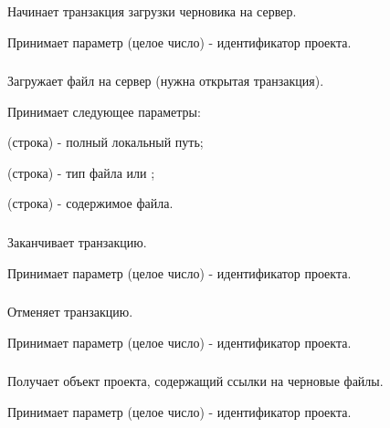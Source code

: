 \subsubsection{}

Начинает транзакция загрузки черновика на сервер.

Принимает параметр  (целое число) - идентификатор проекта.

\subsubsection{}

Загружает файл на сервер (нужна открытая транзакция). 

Принимает следующее параметры:

\begin{icItems}
	\item {} (строка) - полный локальный путь;
	\item {} (строка) - тип файла  или ;
	\item {} (строка) - содержимое файла.
\end{icItems}

\subsubsection{}

Заканчивает транзакцию.

Принимает параметр  (целое число) - идентификатор проекта.

\subsubsection{}

Отменяет транзакцию.

Принимает параметр  (целое число) - идентификатор проекта.

\subsubsection{}

Получает объект проекта, содержащий ссылки на черновые файлы. 

Принимает параметр  (целое число) - идентификатор проекта.

